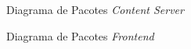 \begin{figure}[h!]
	\centering
	\caption{Diagrama de Pacotes \textit{Content Server}}
	\label{fig08}
\end{figure}
\begin{figure}[h!]
	\centering
	\caption{Diagrama de Pacotes \textit{Frontend}}
	\label{fig09}
\end{figure}

